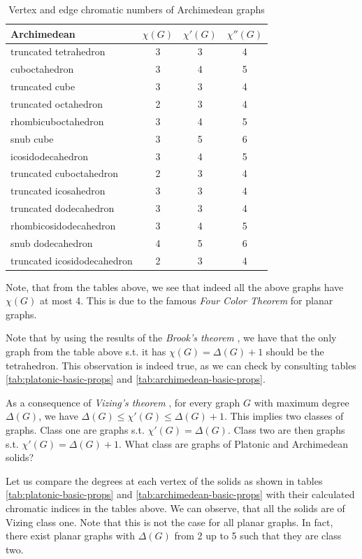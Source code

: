 \begin{table}[H]
\centering
\begin{tabular}{l@{\hspace{1.5cm}}ccc}
\toprule
\textbf{Archimedean} & \textbf{$\chi(G)$} & \textbf{$\chi'(G)$} & \textbf{$\chi''(G)$} \\
\midrule
truncated tetrahedron & 3 & 3 & 4 \\
cuboctahedron & 3 & 4 & 5 \\
truncated cube & 3 & 3 & 4 \\
truncated octahedron & 2 & 3 & 4 \\
rhombicuboctahedron & 3 & 4 & 5 \\
snub cube & 3 & 5 & 6 \\
icosidodecahedron & 3 & 4 & 5 \\
truncated cuboctahedron & 2 & 3 & 4 \\
truncated icosahedron & 3 & 3 & 4 \\
truncated dodecahedron & 3 & 3 & 4 \\
rhombicosidodecahedron & 3 & 4 & 5 \\
snub dodecahedron & 4 & 5 & 6 \\
truncated icosidodecahedron & 2 & 3 & 4 \\
\bottomrule
\end{tabular}
\caption{Vertex and edge chromatic numbers of Archimedean graphs}
\label{tab:archimedean-chrom-nums}
\end{table}

Note, that from the tables above, we see that indeed all the above graphs have $\chi(G)$ at most 4. This is due to the famous \textit{Four Color Theorem} \cite{appelhaken76} for planar graphs.

Note that by using the results of the \textit{Brook's theorem} \cite{brooks41}, we have that the only graph from the table above s.t. it has $\chi(G) = \Delta(G) + 1$ should be the tetrahedron. This observation is indeed true, as we can check by consulting tables \ref{tab:platonic-basic-props} and \ref{tab:archimedean-basic-props}. 

As a consequence of \textit{Vizing's theorem} \cite{misra92}, for every graph $G$ with maximum degree $\Delta(G)$, we have $\Delta(G) \leq \chi'(G) \leq \Delta(G) + 1$. This implies two classes of graphs. Class one are graphs s.t. $\chi'(G) = \Delta(G)$. Class two are then graphs s.t. $\chi'(G) = \Delta(G) + 1$. What class are graphs of Platonic and Archimedean solids?

Let us compare the degrees at each vertex of the solids as shown in tables \ref{tab:platonic-basic-props} and \ref{tab:archimedean-basic-props} with their calculated chromatic indices in the tables above. We can observe, that all the solids are of Vizing class one. Note that this is not the case for all planar graphs. In fact, there exist planar graphs with $\Delta(G)$ from 2 up to 5 such that they are class two.

